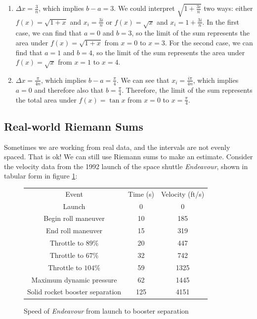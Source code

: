 \begin{Answer}[ref=limsum2]
	\begin{enumerate}
		\item $\Delta x = \frac{3}{n}$, which implies $b-a=3$. We could interpret $\sqrt{1+\frac{3i}{n}}$ two ways: either $f(x) = \sqrt{1+x}$ and $x_i = \frac{3i}{n}$ or $f(x) = \sqrt{x}$ and $x_i=1+\frac{3i}{n}$. In the first case, we can find that $a=0$ and $b=3$, so the limit of the sum represents the area under $f(x) = \sqrt{1+x}$ from $x=0$ to $x=3$. For the second case, we can find that $a=1$ and $b=4$, so the limit of the sum represents the area under $f(x) = \sqrt{x}$ from $x=1$ to $x=4$.
		\item $\Delta x = \frac{\pi}{4n}$, which implies $b-a=\frac{\pi}{4}$. We can see that $x_i = \frac{i\pi}{4n}$, which implies $a=0$ and therefore also that $b=\frac{\pi}{4}$. Therefore, the limit of the sum represents the total area under $f(x) = \tan{x}$ from $x=0$ to $x=\frac{\pi}{4}$.
	\end{enumerate}
\end{Answer}

\subsection{Real-world Riemann Sums}
Sometimes we are working from real data, and the intervals are not evenly spaced. That is ok! We can still use Riemann sums to make an estimate. Consider the velocity data from the 1992 launch of the space shuttle \textit{Endeavour}, shown in tabular form in figure \ref{fig:endeavourdata}:

\begin{figure}
	\centering
	\begin{tabular}{c|c|c}
		Event                           & Time (s) & Velocity (ft/s) \\
		Launch                          & 0        & 0               \\
		Begin roll maneuver             & 10       & 185             \\
		End roll maneuver               & 15       & 319             \\
		Throttle to $89\%$              & 20       & 447             \\
		Throttle to $67\%$              & 32       & 742             \\
		Throttle to $104\%$             & 59       & 1325            \\
		Maximum dynamic pressure        & 62       & 1445            \\
		Solid rocket booster separation & 125      & 4151            \\
	\end{tabular}
	\caption{Speed of \textit{Endeavour} from launch to booster separation}
	\label{fig:endeavourdata}
\end{figure}

